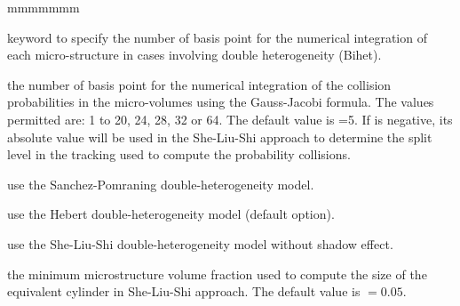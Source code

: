 \begin{ListeDeDescription}{mmmmmmm}
\item[\moc{QUAB}] keyword to specify the number of basis point for the
numerical integration of each micro-structure in cases involving double
heterogeneity (Bihet).

\item[\dusa{iquab}] the number of basis point for the numerical integration of
the collision probabilities in the micro-volumes using the  Gauss-Jacobi
formula. The values permitted are: 1 to 20, 24, 28, 32 or  64. The default value
is =5. If  is negative, its absolute value will be used in the She-Liu-Shi approach to determine the
split level in the tracking used to compute the probability collisions.

\item[\moc{SAPO}] use the Sanchez-Pomraning double-heterogeneity model.\cite{sapo}

\item[\moc{HEBE}] use the Hebert double-heterogeneity model (default option).\cite{BIHET}

\item[\moc{SLSI}] use the She-Liu-Shi double-heterogeneity model without shadow effect.\cite{She2017}

\item[\dusa{frtm}] the minimum microstructure volume fraction used to compute the size of the equivalent cylinder in She-Liu-Shi approach. The default value is
 $=0.05$.

\end{ListeDeDescription}

\eject
